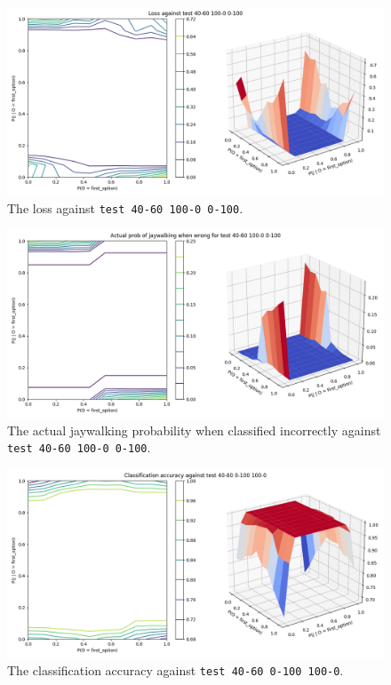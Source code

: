 \documentclass{report}
\newcommand{\code}{\texttt}
\begin{document}
\begin{figure}[h]
    \centering
    \includegraphics[width=\textwidth]{test_40-60_100-0_0-100_loss.png}
    \caption[]{The loss against \code{test 40-60 100-0 0-100}.}
    \label{fig:test_40-60_100-0_0-100_loss_plot}
\end{figure}

\begin{figure}[h]
    \centering
    \includegraphics[width=\textwidth]{test_40-60_100-0_0-100_jay_prob.png}
    \caption[]{The actual jaywalking probability when classified incorrectly against \code{test 40-60 100-0 0-100}.}
    \label{fig:test_40-60_100-0_0-100_jay_prob_plot}
\end{figure}

% 
% 

\begin{figure}[h]
    \centering
    \includegraphics[width=\textwidth]{test_40-60_0-100_100-0_accuracy.png}
    \caption[]{The classification accuracy against \code{test 40-60 0-100 100-0}.}
    \label{fig:test_40-60_0-100_100-0_accuracy_plot}
\end{figure}
\end{document}
